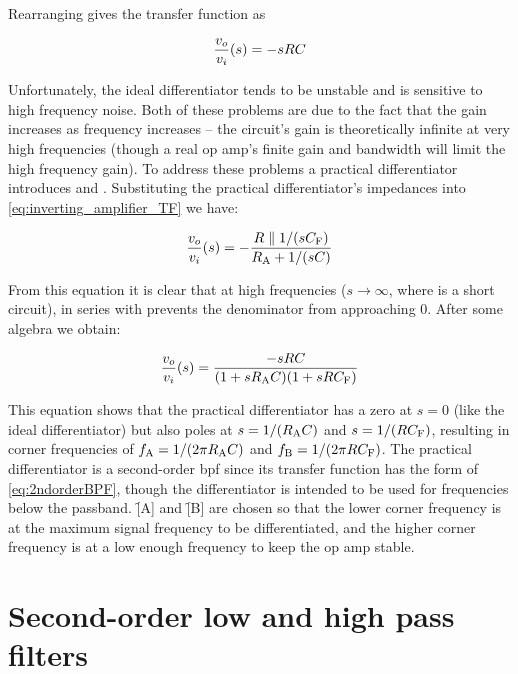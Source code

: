 Rearranging gives the transfer function as

\begin{equation}
	\frac{\vout}{\vin}(s) = -sRC
	\label{eq:ideal_differentiator_TF}
\end{equation}

Unfortunately, the ideal differentiator tends to be unstable and is sensitive to high frequency noise.
Both of these problems are due to the fact that the gain increases as frequency increases -- the circuit's gain is theoretically infinite at very high frequencies (though a real op amp's finite gain and bandwidth will limit the high frequency gain).
To address these problems a practical differentiator introduces \R[A] and \C[F].
Substituting the practical differentiator's impedances into \eqref{eq:inverting_amplifier_TF} we have:

\[\frac{\vout}{\vin}(s) = -\frac{R \parallel 1/(s\C[F])}{\R[A] + 1/(s\C)}\]

From this equation it is clear that at high frequencies (\(s \to \infty\), where \C is a short circuit), \R[A] in series with \C prevents the denominator from approaching 0.
After some algebra we obtain:

\begin{equation}
	\frac{\vout}{\vin}(s) = \frac{-sRC}{(1 + s\R[A] C)(1 + s R \C[F])}
	\label{eq:practical_differentiator_TF}
\end{equation}

This equation shows that the practical differentiator has a zero at \(s = 0\) (like the ideal differentiator) but also poles at \(s = 1/(\R[A] C)\) and \(s = 1/(R \C[F])\), resulting in corner frequencies of \(\f[A] = 1/(2\pi\R[A] C)\) and \(\f[B] = 1/(2\pi R \C[F])\).
The practical differentiator is a second-order \ac{bpf} since its transfer function has the form of \eqref{eq:2ndorderBPF}, though the differentiator is intended to be used for frequencies below the passband.
\f[A] and \f[B] are chosen so that the lower corner frequency is at the maximum signal frequency to be differentiated, and the higher corner frequency is at a low enough frequency to keep the op amp stable.

\section{Second-order low and high pass filters}
